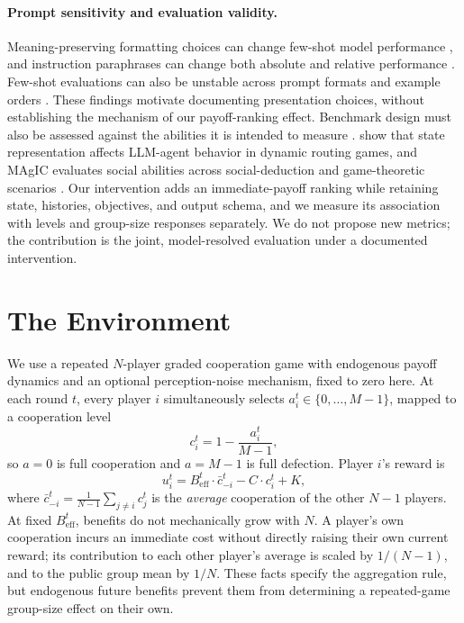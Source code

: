 \documentclass[11pt]{article}
\begin{document}
\paragraph{Prompt sensitivity and evaluation validity.}
Meaning-preserving formatting choices can change few-shot model performance \citep{sclar2024formatting}, and instruction paraphrases can change both absolute and relative performance \citep{mizrahi2024multiprompt}. Few-shot evaluations can also be unstable across prompt formats and example orders \citep{zhao2021calibrate}. These findings motivate documenting presentation choices, without establishing the mechanism of our payoff-ranking effect. Benchmark design must also be assessed against the abilities it is intended to measure \citep{bowman2021benchmarking}.
\citet{goodyear2025state} show that state representation affects LLM-agent behavior in dynamic routing games, and MAgIC evaluates social abilities across social-deduction and game-theoretic scenarios \citep{xu2024magic}. Our intervention adds an immediate-payoff ranking while retaining state, histories, objectives, and output schema, and we measure its association with levels and group-size responses separately. We do not propose new metrics; the contribution is the joint, model-resolved evaluation under a documented intervention.

\section{The Environment}
\label{sec:env}
We use a repeated $N$-player graded cooperation game with endogenous payoff dynamics and an optional perception-noise mechanism, fixed to zero here. At each round $t$, every player $i$ simultaneously selects $a^t_i \in \{0,\dots,M-1\}$, mapped to a cooperation level
\begin{equation}
  c^t_i = 1 - \frac{a^t_i}{M-1},
\end{equation}
so $a=0$ is full cooperation and $a=M-1$ is full defection. Player $i$'s reward is
\begin{equation}
  u^t_i = B^t_{\text{eff}} \cdot \bar{c}^t_{-i} - C \cdot c^t_i + K,
\end{equation}
where $\bar{c}^t_{-i} = \frac{1}{N-1}\sum_{j \neq i} c^t_j$ is the \emph{average} cooperation of the other $N-1$ players. At fixed $B^t_{\text{eff}}$, benefits do not mechanically grow with $N$. A player's own cooperation incurs an immediate cost without directly raising their own current reward; its contribution to each other player's average is scaled by $1/(N-1)$, and to the public group mean by $1/N$. These facts specify the aggregation rule, but endogenous future benefits prevent them from determining a repeated-game group-size effect on their own.
\end{document}
